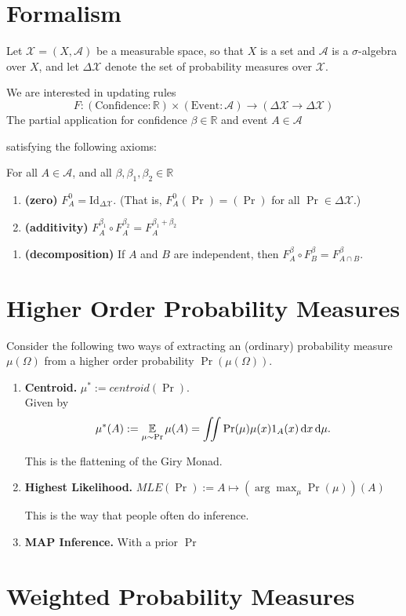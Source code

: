 \documentclass{article}
\begin{document}
\section{Formalism}
\def\X{\mathcal X}
Let $\X = (X, \mathcal A)$ be a measurable space, so that $X$ is a set and $\mathcal A$ is a $\sigma$-algebra over $X$, and let $\Delta \X$ denote the set of probability measures over $\X$.

We are interested in updating rules
\[ F: (\text{Confidence} : \mathbb R) \times (\text{Event} : \mathcal A) \to (\Delta\X  \to \Delta \X) \]
The partial application for confidence $\beta \in \mathbb R$ and event $A \in \mathcal A$  

satisfying the following axioms:

For all $A \in \mathcal A$, and all $\beta,\beta_1, \beta_2 \in \mathbb R$
\begin{enumerate}
    \item \textbf{(zero)} $F^{0}_A  =  \mathrm{Id}_{\Delta\X}$. (That is, $F^{0}_A(\Pr) = (\Pr)$ for all $\Pr \in \Delta\X$.)
    \item \textbf{(additivity)} $F^{\beta_1}_A \circ F^{\beta_2}_A = F^{\beta_1 + \beta_2}_A$
\end{enumerate}

\begin{enumerate}[]
    \item \textbf{(decomposition)} If $A$ and $B$ are independent, then $F^{\beta}_A \circ F^{\beta}_B = F^{\beta}_{A \cap B}$.
\end{enumerate}

\section{Higher Order Probability Measures}
Consider the following two ways of extracting an (ordinary) probability measure $\mu(\Omega)$
from a higher order probability $\Pr(\mu(\Omega))$.

\begin{enumerate}
    \item \textbf{Centroid.}  
        $\mu^* := \textit{centroid}(\Pr)$.\\
        Given by 
        \[
            \mu^*(A) := \operatorname*{\mathbb{E}}_{\mu \sim \Pr} \mu(A) = 
                \iint \Pr(\mu) \mu(x) 1_{A}(x)\, \mathrm d x\,\mathrm d\mu.
        \]
        
        This is the flattening of the Giry Monad.
        
    \item \textbf{Highest Likelihood.}    
        $\textit{MLE}(\Pr) := A \mapsto (\arg\max_\mu \Pr(\mu))(A)$
        
        This is the way that people often do inference.
        
    \item \textbf{MAP Inference.}
        With a prior $\Pr$

\end{enumerate}
 


\section{Weighted Probability Measures}
\end{document}
